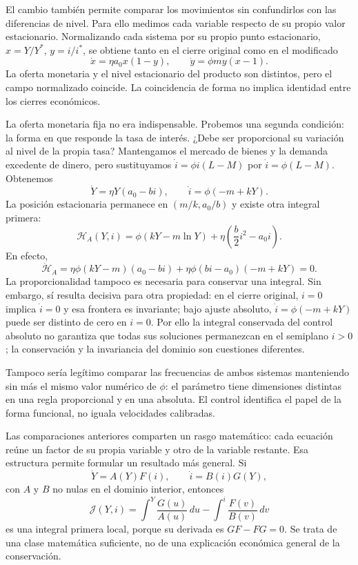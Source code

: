 \documentclass[10.5pt,twoside]{article}
\begin{document}
El cambio también permite comparar los movimientos sin confundirlos con las diferencias de nivel. Para ello medimos cada variable respecto de su propio valor estacionario. Normalizando cada sistema por su propio punto estacionario, $x=Y/Y^*$, $y=i/i^*$, se obtiene tanto en el cierre original como en el modificado
\[
 \mathord{\dot x=\eta a_0x(1-y),\qquad
 \dot y=\phi my(x-1).}
\]
La oferta monetaria y el nivel estacionario del producto son distintos, pero el campo normalizado coincide. La coincidencia de forma no implica identidad entre los cierres económicos.

La oferta monetaria fija no era indispensable. Probemos una segunda condición: la forma en que responde la tasa de interés. ¿Debe ser proporcional su variación al nivel de la propia tasa? Mantengamos el mercado de bienes y la demanda excedente de dinero, pero sustituyamos $\dot i=\phi i(L-M)$ por $\dot i=\phi(L-M)$. Obtenemos
\[
 \mathord{\dot Y=\eta Y(a_0-bi),\qquad
 \dot i=\phi(-m+kY).}
\]
La posición estacionaria permanece en $(m/k,a_0/b)$ y existe otra integral primera:
\[
 \mathord{\mathcal H_A(Y,i)=\phi(kY-m\ln Y)
 +\eta\left(\frac b2 i^2-a_0i\right).}
\]
En efecto,
\[
 \dot{\mathcal H}_A=\eta\phi(kY-m)(a_0-bi)
 +\eta\phi(bi-a_0)(-m+kY)=0.
\]
La proporcionalidad tampoco es necesaria para conservar una integral. Sin embargo, sí resulta decisiva para otra propiedad: en el cierre original, $i=0$ implica $\dot i=0$ y esa frontera es invariante; bajo ajuste absoluto, $\dot i=\phi(-m+kY)$ puede ser distinto de cero en $i=0$. Por ello la integral conservada del control absoluto no garantiza que todas sus soluciones permanezcan en el semiplano $i>0$; la conservación y la invariancia del dominio son cuestiones diferentes.

Tampoco sería legítimo comparar las frecuencias de ambos sistemas manteniendo sin más el mismo valor numérico de $\phi$: el parámetro tiene dimensiones distintas en una regla proporcional y en una absoluta. El control identifica el papel de la forma funcional, no iguala velocidades calibradas.

Las comparaciones anteriores comparten un rasgo matemático: cada ecuación reúne un factor de su propia variable y otro de la variable restante. Esa estructura permite formular un resultado más general. Si
\[
 \dot Y=A(Y)F(i),\qquad \dot i=B(i)G(Y),
\]
con $A$ y $B$ no nulas en el dominio interior, entonces
\[
 \mathcal J(Y,i)=\int^Y\frac{G(u)}{A(u)}\,du
 -\int^i\frac{F(v)}{B(v)}\,dv
\]
es una integral primera local, porque su derivada es $GF-FG=0$. Se trata de una clase matemática suficiente, no de una explicación económica general de la conservación.
\end{document}
